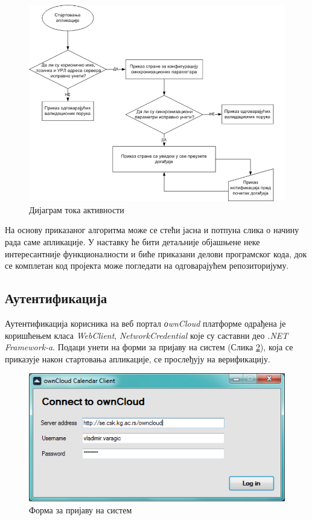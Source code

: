 \begin{figure}[H]
	\centering
	\includegraphics[scale=0.5]{slike/tok_aktivnosti.png}
	\caption{Дијаграм тока активности}
	\label{fig:application_alogorithm}
\end{figure}

На основу приказаног алгоритма  може се стећи јасна и потпуна слика о начину рада саме апликације. У наставку ће бити детаљније објашњене неке интересантније функционалности и биће приказани делови програмског кода, док се комплетан код пројекта може погледати на одговарајућем репозиторијуму\cite{svn_repo}.

\subsection{Аутентификација}

Аутентификација корисника на веб портал \textit{оwnCloud} платформе одрађена је коришћењем класа \textit{WebClient}, \textit{NetworkCredential} које су саставни део \textit{.NET Framework-a}.  Подаци унети на форми за пријаву на систем (Слика \ref{fig:login_form}), која се приказује након стартовања апликације, се прослеђују на верификацију.

\begin{figure}[H]
	\centering
	\includegraphics[scale=0.5]{slike/logInForm.png}
	\caption{Форма за пријаву на систем}
	\label{fig:login_form}
\end{figure}

